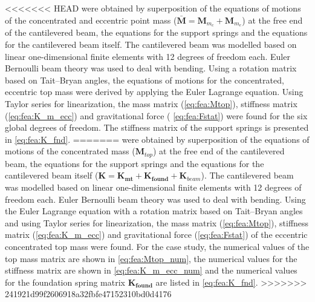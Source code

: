 \documentclass{article}
\begin{document}
<<<<<<< HEAD
were obtained by superposition of the equations of motions of the concentrated and eccentric point mass ($ \mathbf{\bar{M}} = \mathbf{M}_{m_c} + \mathbf{M}_{m_e}$) at the free end of the cantilevered beam, the equations for the support springs and the equations for the cantilevered beam itself. The cantilevered beam was modelled based on linear one-dimensional finite elements with 12 degrees of freedom each. Euler Bernoulli beam theory was used to deal with bending. Using a rotation matrix based on Tait–Bryan angles, the equations of motions for the concentrated, eccentric top mass were derived by applying the Euler Lagrange equation. Using Taylor series for linearization, the mass matrix (\autoref{eq:fea:Mtop}), stiffness matrix (\autoref{eq:fea:K_m_ecc}) and gravitational force ( \autoref{eq:fea:Fstat}) were found for the six global degrees of freedom. The stiffness matrix of the support springs is presented in \autoref{eq:fea:K_fnd}. 
=======
were obtained by superposition of the equations of motions of the concentrated mass ($\mathbf{M}_{top}$) at the free end of the cantilevered beam, the equations for the support springs and the equations for the cantilevered beam itself ($\mathbf{K} = \mathbf{K_{mt}} + \mathbf{K_{found}}+\mathbf{K}_{beam}$). The cantilevered beam was modelled based on linear one-dimensional finite elements with 12 degrees of freedom each. Euler Bernoulli beam theory was used to deal with bending. Using the Euler Lagrange equation with a rotation matrix based on Tait–Bryan angles and using Taylor series for linearization,  the mass matrix (\autoref{eq:fea:Mtop}), stiffness matrix (\autoref{eq:fea:K_m_ecc}) and gravitational force (\autoref{eq:fea:Fstat}) of the eccentric concentrated top mass were found. For the case study, the numerical values of the top mass matrix are shown in \autoref{eq:fea:Mtop_num}, the numerical values for the stiffness matrix are shown in \autoref{eq:fea:K_m_ecc_num} and the numerical values for the foundation spring matrix $\mathbf{K_{found}}$ are listed in \autoref{eq:fea:K_fnd}.
>>>>>>> 241921d99f2606918a32fbfe47152310bd0d4176
\end{document}
